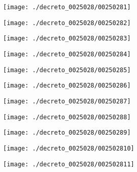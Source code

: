 \begin{figure}[!ht]
    \centering
    \texttt{[image: ./decreto\_0025028/00250281]}
\end{figure}
\clearpage

\begin{figure}[!ht]
    \centering
    \texttt{[image: ./decreto\_0025028/00250282]}
\end{figure}
\clearpage

\begin{figure}[!ht]
    \centering
    \texttt{[image: ./decreto\_0025028/00250283]}
\end{figure}
\clearpage

\begin{figure}[!ht]
    \centering
    \texttt{[image: ./decreto\_0025028/00250284]}
\end{figure}
\clearpage

\begin{figure}[!ht]
    \centering
    \texttt{[image: ./decreto\_0025028/00250285]}
\end{figure}
\clearpage

\begin{figure}[!ht]
    \centering
    \texttt{[image: ./decreto\_0025028/00250286]}
\end{figure}
\clearpage

\begin{figure}[!ht]
    \centering
    \texttt{[image: ./decreto\_0025028/00250287]}
\end{figure}
\clearpage

\begin{figure}[!ht]
    \centering
    \texttt{[image: ./decreto\_0025028/00250288]}
\end{figure}
\clearpage

\begin{figure}[!ht]
    \centering
    \texttt{[image: ./decreto\_0025028/00250289]}
\end{figure}
\clearpage

\begin{figure}[!ht]
    \centering
    \texttt{[image: ./decreto\_0025028/002502810]}
\end{figure}
\clearpage

\begin{figure}[!ht]
    \centering
    \texttt{[image: ./decreto\_0025028/002502811]}
\end{figure}
\clearpage

